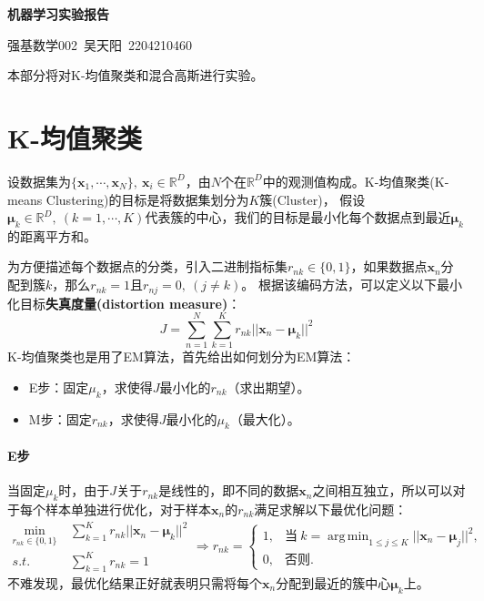 \documentclass[12pt, a4paper, oneside]{ctexart}
\newenvironment{myTitle}[1]{
    \begin{center}
    {\zihao{-2}\bf #1\\}
    \zihao{-4}\it
}{\end{center}}  %
\DeclareMathOperator*{\argmin}{arg\,min}  %
\let\leq=\leqslant %
\def\bd{\boldsymbol}        %
\def\R{\mathbb{R}}          %
\begin{document}
\clearpage
\begin{myTitle}{机器学习实验报告}
    强基数学002\ 吴天阳\ 2204210460
\end{myTitle}
本部分将对K-均值聚类和混合高斯进行实验。
\section{K-均值聚类}
设数据集为$\{\bd{x}_1,\cdots,\bd{x}_N\},\ \bd{x}_i\in\R^D$，由$N$个在$\R^D$中的观测值构成。K-均值聚类(K-means Clustering)的目标是将数据集划分为$K$簇(Cluster)，
假设$\bd{\mu}_k\in\R^D,\ (k=1,\cdots,K)$代表簇的中心，我们的目标是最小化每个数据点到最近$\bd{\mu}_k$的距离平方和。

为方便描述每个数据点的分类，引入二进制指标集$r_{nk}\in\{0,1\}$，如果数据点$\bd{x}_n$分配到簇$k$，那么$r_{nk} = 1$且$r_{nj}=0,\ (j\neq k)$。
根据该编码方法，可以定义以下最小化目标\textbf{失真度量(distortion measure)}：
\begin{equation}\label{eq-kmeansJ}
    J = \sum_{n=1}^N\sum_{k=1}^Kr_{nk}||\bd{x}_n-\bd{\mu}_k||^2
\end{equation}
K-均值聚类也是用了EM算法，首先给出如何划分为EM算法：
\begin{itemize}
    \item E步：固定$\mu_k$，求使得$J$最小化的$r_{nk}$（求出期望）。
    \item M步：固定$r_{nk}$，求使得$J$最小化的$\mu_k$（最大化）。
\end{itemize}
\paragraph{E步}当固定$\mu_k$时，由于$J$关于$r_{nk}$是线性的，即不同的数据$\bd{x}_n$之间相互独立，所以可以对于每个样本单独进行优化，对于样本$\bd{x}_n$的$r_{nk}$满足求解以下最优化问题：
\begin{equation*}
    \begin{aligned}
        \min_{r_{nk}\in\{0,1\}}&\ \sum_{k=1}^Kr_{nk}||\bd{x}_n-\bd{\mu}_k||^2\\
        s.t.&\ \sum_{k=1}^Kr_{nk} = 1
    \end{aligned}\Rightarrow r_{nk} = \begin{cases}
        1, &\text{当}\ k=\argmin_{1\leq j\leq K}||\bd{x}_n-\bd{\mu}_j||^2,\\
        0, &\text{否则}.
    \end{cases}
\end{equation*}
不难发现，最优化结果正好就表明只需将每个$\bd{x}_n$分配到最近的簇中心$\bd{\mu}_k$上。
\end{document}
